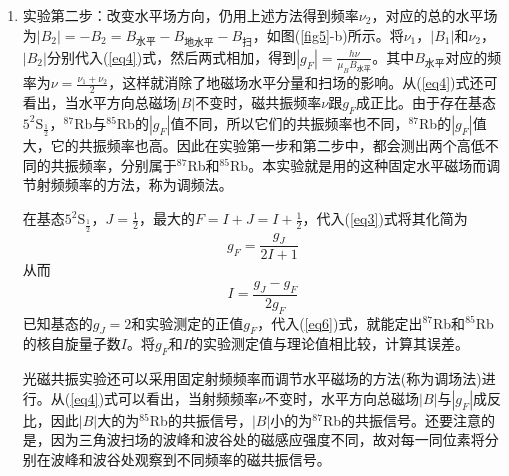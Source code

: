 \documentclass[a4paper]{article}
\begin{document}
\begin{enumerate}
\item 实验第二步：改变水平场方向，仍用上述方法得到频率$\nu_2$，对应的总的水平场为$|B_2| = -B_2 = B_{\text{水平}} - B_{\text{地水平}} - B_{\text{扫}}$，如图(\ref{fig5}-b)所示。将$\nu_1$，$|B_1|$和$\nu_2$，$|B_2|$分别代入(\ref{eq4})式，然后两式相加，得到$|g_F| = \frac{h\nu}{\mu_BB_{\text{水平}}}$。其中$B_{\text{水平}}$对应的频率为$\nu = \frac{\nu_1 + \nu_2}{2}$，这样就消除了地磁场水平分量和扫场的影响。从(\ref{eq4})式还可看出，当水平方向总磁场$|B|$不变时，磁共振频率$\nu$跟$g_F$成正比。由于存在基态$5^2\text{S}_{\frac{1}{2}}$，$^{87}$Rb与$^{85}$Rb的$|g_F|$值不同，所以它们的共振频率也不同，$^{87}$Rb的$|g_F|$值大，它的共振频率也高。因此在实验第一步和第二步中，都会测出两个高低不同的共振频率，分别属于$^{87}$Rb和$^{85}$Rb。本实验就是用的这种固定水平磁场而调节射频频率的方法，称为调频法。

在基态$5^2\text{S}_{\frac{1}{2}}$，$J=\frac{1}{2}$，最大的$F=I+J=I+\frac{1}{2}$，代入(\ref{eq3})式将其化简为
\begin{equation}
g_F = \frac{g_J}{2I+1}\label{eq5}
\end{equation}
从而
\begin{equation}
I = \frac{g_J - g_F}{2g_F}\label{eq6}
\end{equation}
已知基态的$g_J=2$和实验测定的正值$g_F$，代入(\ref{eq6})式，就能定出$^{87}$Rb和$^{85}$Rb的核自旋量子数$I$。将$g_F$和$I$的实验测定值与理论值相比较，计算其误差。

光磁共振实验还可以采用固定射频频率而调节水平磁场的方法(称为调场法)进行。从(\ref{eq4})式可以看出，当射频频率$\nu$不变时，水平方向总磁场$|B|$与$|g_F|$成反比，因此$|B|$大的为$^{85}$Rb的共振信号，$|B|$小的为$^{87}$Rb的共振信号。还要注意的是，因为三角波扫场的波峰和波谷处的磁感应强度不同，故对每一同位素将分别在波峰和波谷处观察到不同频率的磁共振信号。
\end{enumerate}
\end{document}
